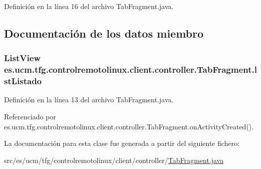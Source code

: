 Definición en la línea 16 del archivo Tab\-Fragment.\-java.



\subsection{Documentación de los datos miembro}
\hypertarget{classes_1_1ucm_1_1tfg_1_1controlremotolinux_1_1client_1_1controller_1_1TabFragment_aa760860103fdc80e525a91729fc8a50b}{
\subsubsection[{lst\-Listado}]{\setlength{\rightskip}{0pt plus 5cm}List\-View es.\-ucm.\-tfg.\-controlremotolinux.\-client.\-controller.\-Tab\-Fragment.\-lst\-Listado\hspace{0.3cm}{\ttfamily [private]}}}\label{classes_1_1ucm_1_1tfg_1_1controlremotolinux_1_1client_1_1controller_1_1TabFragment_aa760860103fdc80e525a91729fc8a50b}


Definición en la línea 13 del archivo Tab\-Fragment.\-java.



Referenciado por es.\-ucm.\-tfg.\-controlremotolinux.\-client.\-controller.\-Tab\-Fragment.\-on\-Activity\-Created().



La documentación para esta clase fue generada a partir del siguiente fichero\-:\begin{DoxyCompactItemize}
\item 
src/es/ucm/tfg/controlremotolinux/client/controller/\hyperlink{TabFragment_8java}{Tab\-Fragment.\-java}\end{DoxyCompactItemize}
